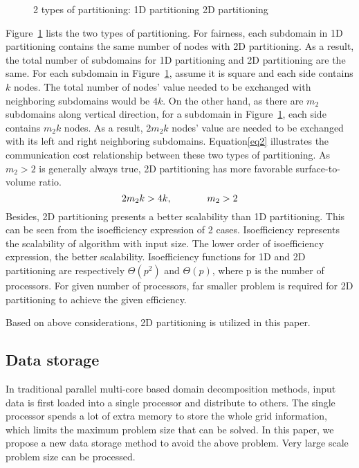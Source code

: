 \documentclass{sig-alternate}
\begin{document}
	\begin{figure}[htbp]
	  \caption{2 types of partitioning:
	   1D partitioning
	   2D partitioning }
	  \label{Fig3}
	\end{figure}
	Figure~\ref{Fig3} lists the two types of partitioning. For fairness, each subdomain in 1D partitioning contains the 
	same number of nodes with 2D partitioning. As a result, the total number of subdomains for 1D partitioning and 2D partitioning are the same. For 
	each subdomain 
	in Figure~\ref{Fig3}, assume  it is square and each side contains $k$ nodes. The total 
	number of nodes' value needed to be exchanged with neighboring subdomains would be $4k$. On the other hand, as 
	there are $m_2$ subdomains along vertical direction, for a subdomain in Figure~\ref{Fig3}, each side contains
	$m_2k$ nodes. As a result, $2m_2k$ nodes' value are needed to be exchanged with its left and right 
	neighboring subdomains. Equation\eqref{eq2} illustrates the communication cost relationship between these two types of
	partitioning. As $m_2>2$ is generally always true, 2D partitioning has more favorable surface-to-volume ratio.    
	\begin{equation}
		2m_2k > 4k, \hspace{0.5 in} m_2 > 2 \label{eq2}
	\end{equation}
	Besides, 2D partitioning presents a better scalability than 1D partitioning. This can be
	seen from the isoefficiency expression of 2 cases. Isoefficiency represents the scalability of algorithm
	with input size. The lower order of isoefficiency expression, the better scalability. Isoefficiency functions for 1D 
	and 2D partitioning are respectively $\Theta(p^2)$ and $\Theta(p)$\cite{Grama, Kumar}, where p is the number of processors. 
	For given number of processors, far smaller problem is required for 2D partitioning to achieve the given efficiency.

	Based on above considerations, 2D partitioning is utilized in this paper. 
  \subsection{Data storage}
	In traditional parallel multi-core based domain decomposition methods, input data is first loaded into a single processor 
	and distribute to others. The single processor spends a lot of extra memory to store the whole grid information,
	which limits the maximum problem size that can be solved. In this paper, we propose a new data storage method to avoid the 
	above problem. Very large scale problem size can be processed.
\end{document}
